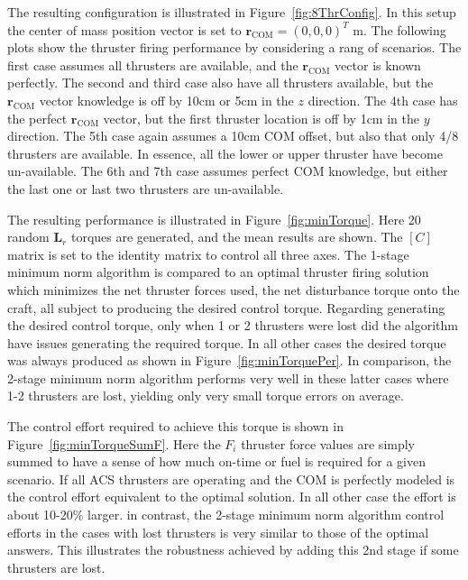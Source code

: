 The resulting configuration is illustrated in Figure~\ref{fig:8ThrConfig}.  In this setup the center of mass position vector is set to $\bm r_{\text{COM}} = (0,0,0)^{T} \text{ m}$.  The following plots show the thruster firing performance by considering a rang of scenarios.  The first case assumes all thrusters are available, and the $\bm r_{\text{COM}}$ vector is known perfectly.  The second and third case also have all thrusters available, but the $\bm r_{\text{COM}}$ vector knowledge is off by 10cm or 5cm in the $z$ direction.  The 4th case has the perfect $\bm r_{\text{COM}}$ vector, but the first thruster location is off by 1cm in the $y$ direction.  The 5th case again assumes a 10cm COM offset, but also that only 4/8 thrusters are available.  In essence, all the lower or upper thruster have become un-available.  The 6th and 7th case assumes perfect COM knowledge, but either the last one or last two thrusters are un-available.


The resulting performance is illustrated in Figure~\ref{fig:minTorque}.  Here 20 random $\bm L_{r}$ torques are generated, and the mean results are shown.  The $[C]$ matrix is set to the identity matrix to control all three axes.   The 1-stage minimum norm algorithm is compared to an optimal thruster firing solution which minimizes the net thruster forces used, the net disturbance torque onto the craft, all subject to producing the desired control torque.    Regarding generating the desired control torque, only when 1 or 2 thrusters were lost did the algorithm have issues generating the required torque.  In all other cases the desired torque was always produced as shown in Figure~\ref{fig:minTorquePer}.  In comparison, the 2-stage minimum norm algorithm performs very well in these latter cases where 1-2 thrusters are lost, yielding only very small torque errors on average.

The control effort required to achieve this torque is shown in Figure~\ref{fig:minTorqueSumF}.  Here the $F_{i}$ thruster force values are simply summed to have a sense of how much on-time or fuel is required for a given scenario.  If all ACS thrusters are operating and the COM is perfectly modeled is the control effort equivalent to the optimal solution.  In all other case the effort is about 10-20\% larger.  in contrast, the 2-stage minimum norm algorithm control efforts in the cases with lost thrusters is very similar to those of the optimal answers.  This illustrates the robustness achieved by adding this 2nd stage if some thrusters are lost.

